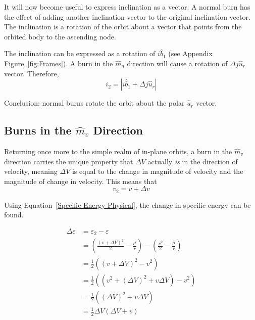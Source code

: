 \documentclass[../basicOrbitalDynamics.tex]{subfiles}
\begin{document}
It will now become useful to express inclination as a vector. A normal burn has the effect of adding another inclination vector to the original inclination vector. The inclination is a rotation of the orbit about a vector that points from the orbited body to the ascending node.

The inclination can be expressed as a rotation of $i\hat{b}_1$ (see Appendix Figure~\ref{fig:Frames}). A burn in the $\hat{m}_n$ direction will cause a rotation of $\Delta j\hat{u}_r$ vector. Therefore,
\[i_2=|i\hat{b}_1+\Delta j\hat{u}_r|\]

Conclusion: normal burns rotate the orbit about the polar $\hat{u}_r$ vector.

\bigskip\bigskip
\subsection{Burns in the \texorpdfstring{$\hat{m}_v$}{Velocity} Direction}

Returning once more to the simple realm of in-plane orbits, a burn in the $\hat{m}_v$ direction carries the unique property that $\Delta V$ actually \textit{is} in the direction of velocity, meaning $\Delta V$ is equal to the change in magnitude of velocity and the magnitude of change in velocity. This means that
\[v_2=v+\Delta v\]

Using Equation~\eqref{Specific Energy Physical}, the change in specific energy can be found.

\begin{align*}
    \Delta \varepsilon & = \varepsilon_2 - \varepsilon                                                                        \\
                       & = \left(\frac{(v+\Delta V)^2}{2}-\frac{\mu{}}{r}\right) - \left(\frac{v^2}{2}-\frac{\mu{}}{r}\right) \\
                       & = \frac{1}{2}\left(\left(v+\Delta V\right)^2-v^2\right)                                              \\
                       & = \frac{1}{2}\left(\left(v^2+(\Delta V)^2+v\Delta V\right)-v^2\right)                                \\
                       & = \frac{1}{2}\left((\Delta V)^2+v\Delta V\right)                                                     \\
                       & = \frac{1}{2}\Delta V\left(\Delta V+v\right)                                                         \\
\end{align*}
\end{document}
